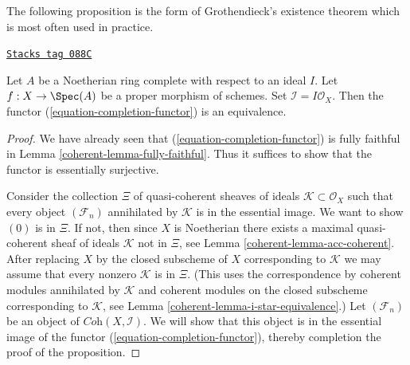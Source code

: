The following proposition is the form of Grothendieck's existence
theorem which is most often used in practice.

\begin{proposition}
\label{coherent-proposition-existence-proper}
\href{https://stacks.math.columbia.edu/tag/088C}{\texttt{Stacks tag 088C}}

Let $A$ be a Noetherian ring complete with respect to an ideal $I$.
Let $f : X \to \Spec(A)$ be a proper morphism of schemes.
Set $\mathcal{I} = I\mathcal{O}_X$.
Then the functor (\ref{equation-completion-functor}) is an equivalence.
\end{proposition}

\begin{proof}

We have already seen that (\ref{equation-completion-functor}) is
fully faithful in Lemma \ref{coherent-lemma-fully-faithful}. Thus it suffices
to show that the functor is essentially surjective.

\medskip\noindent
Consider the collection $\Xi$ of quasi-coherent sheaves of ideals
$\mathcal{K} \subset \mathcal{O}_X$ such that every object
$(\mathcal{F}_n)$ annihilated by $\mathcal{K}$ is in the essential image.
We want to show $(0)$ is in $\Xi$. If not, then since $X$ is Noetherian
there exists a maximal quasi-coherent sheaf of ideals $\mathcal{K}$
not in $\Xi$, see
Lemma \ref{coherent-lemma-acc-coherent}.
After replacing $X$ by the closed subscheme of $X$
corresponding to $\mathcal{K}$ we may assume that every nonzero
$\mathcal{K}$ is in $\Xi$. (This uses the correspondence by
coherent modules annihilated by $\mathcal{K}$ and coherent modules
on the closed subscheme corresponding to $\mathcal{K}$, see
Lemma \ref{coherent-lemma-i-star-equivalence}.)
Let $(\mathcal{F}_n)$ be an object of
$\textit{Coh}(X, \mathcal{I})$.
We will show that this object is in the essential image of the
functor (\ref{equation-completion-functor}), thereby completion the
proof of the proposition.


\end{proof}
